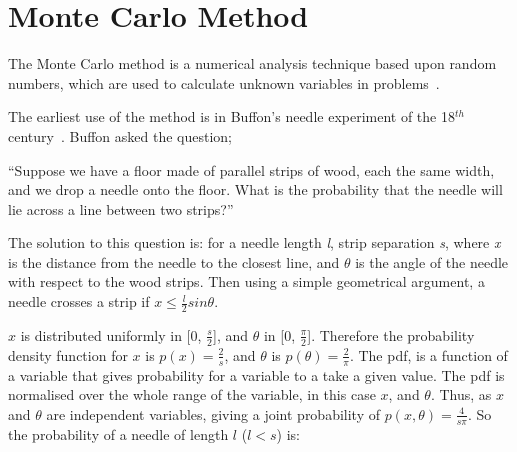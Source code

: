 


\section{Monte Carlo Method}\label{sec:mcmethod}
The Monte Carlo method is a numerical analysis technique based upon random numbers, which are used to calculate unknown variables in problems~\cite{cashwell1959practical,rogers1990monte}. 

The earliest use of the method is in Buffon's needle experiment of the 18$^{th}$ century~\cite{badger1994lazzarini,beckmann2015history,buffon1785histoire}. Buffon asked the question;

\medskip

``Suppose we have a floor made of parallel strips of wood, each the same width, and we drop a needle onto the floor. What is the probability that the needle will lie across a line between two strips?''

\medskip

The solution to this question is:
for a needle length \textit{l}, strip separation \textit{s}, where \textit{x} is the distance from the needle to the closest line, and $\theta$ is the angle of the needle with respect to the wood strips. Then using a simple geometrical argument, a needle crosses a strip if $x \leq \tfrac{l}{2} sin \theta$.

$x$ is distributed uniformly in [0, $\tfrac{s}{2}$], and $\theta$ in [0, $\tfrac{\pi}{2}$]. Therefore the probability density function for $x$ is $p(x)=\tfrac{2}{s}$, and $\theta$ is $p(\theta) = \tfrac{2}{\pi}$. The \gls*{pdf}, is a function of a variable that gives probability for a variable to a take a given value. The \gls*{pdf} is normalised over the whole range of the variable, in this case $x$, and $\theta$.
Thus, as $x$ and $\theta$ are independent variables, giving a joint probability of $p(x,\theta) = \tfrac{4}{s \pi}$.
So the probability of a needle of length $l$ ($l<s$) is:

